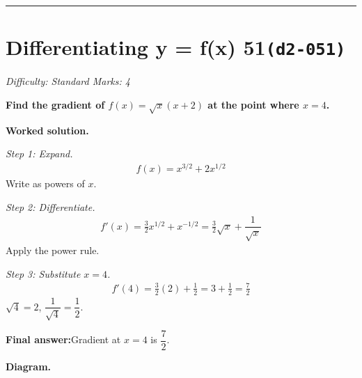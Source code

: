 \documentclass[11pt]{article}
\newcommand{\question}[1]{\par\medskip\noindent\textbf{#1}\par}
\begin{document}
\medskip\hrule

\section*{Differentiating y = f(x) 51\quad\small\texttt{(d2-051)}}
\textit{Difficulty: Standard \quad\textbar\quad Marks: 4}

\question{Find the gradient of \( f(x) = \sqrt{x}(x + 2) \) at the point where \( x = 4 \).}

\textbf{Worked solution.}

\textit{Step 1: Expand.}
\[\begin{gathered}
f(x) = x^{3/2} + 2x^{1/2}
\end{gathered}\]
Write as powers of \( x \).

\textit{Step 2: Differentiate.}
\[\begin{gathered}
f'(x) = \tfrac{3}{2}x^{1/2} + x^{-1/2} = \tfrac{3}{2}\sqrt{x} + \dfrac{1}{\sqrt{x}}
\end{gathered}\]
Apply the power rule.

\textit{Step 3: Substitute \( x = 4 \).}
\[\begin{gathered}
f'(4) = \tfrac{3}{2}(2) + \tfrac{1}{2} = 3 + \tfrac{1}{2} = \tfrac{7}{2}
\end{gathered}\]
\( \sqrt{4} = 2 \), \( \dfrac{1}{\sqrt{4}} = \dfrac{1}{2} \).

\begin{answerbox}
\textbf{Final answer:}\quad Gradient at \(\displaystyle  x = 4 \) is \(\displaystyle  \dfrac{7}{2} \).
\end{answerbox}
\textbf{Diagram.}
\end{document}
